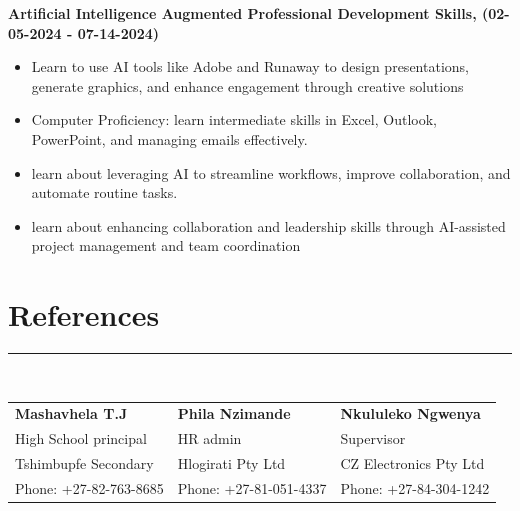 \documentclass[12pt]{article}
\begin{document}
\hspace{-7mm}\textbf{Artificial Intelligence Augmented Professional Development Skills, (02-05-2024 - 07-14-2024)}
\vspace{-3mm}
\begin{itemize}
  \item Learn to use AI tools like Adobe and Runaway to design presentations, generate graphics, and enhance engagement through creative solutions
  \vspace{-3mm}
  \item Computer Proficiency: learn intermediate skills in Excel, Outlook, PowerPoint, and managing emails effectively.
  \vspace{-3mm}
  \item learn about leveraging AI to streamline workflows, improve collaboration, and automate routine tasks.
  \vspace{-3mm}
  \item learn about enhancing collaboration and leadership skills through AI-assisted project management and team coordination
  \vspace{-3mm}
\end{itemize}

\vspace{-3mm}\section*{\fontsize{14}{1}\selectfont\color{color_29791}References}\vspace{-9pt} 
\rule{\textwidth}{0.4pt}
\vspace{2pt}\\
\begin{tabular}{p{} p{} p{}}
  \textbf{Mashavhela T.J} & 
  \textbf{Phila Nzimande} & 
  \textbf{Nkululeko Ngwenya} \\
  High School principal & 
  HR admin& 
  Supervisor\\
  Tshimbupfe Secondary & 
  Hlogirati Pty Ltd& 
  CZ Electronics Pty Ltd\\ 
  Phone: +27-82-763-8685  & 
  Phone: +27-81-051-4337 & 
  Phone: +27-84-304-1242 \\
\end{tabular}
\end{document}
